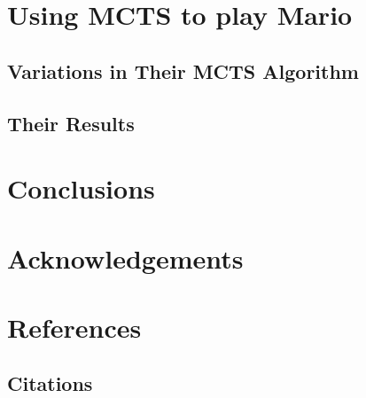 \documentclass{sig-alternate}
\begin{document}
\section{Using MCTS to play Mario}

\subsection{Variations in Their MCTS Algorithm}

\subsection{Their Results}

\section{Conclusions}

\section{Acknowledgements}

\section{References}

\subsection{Citations}


  
\end{document}
